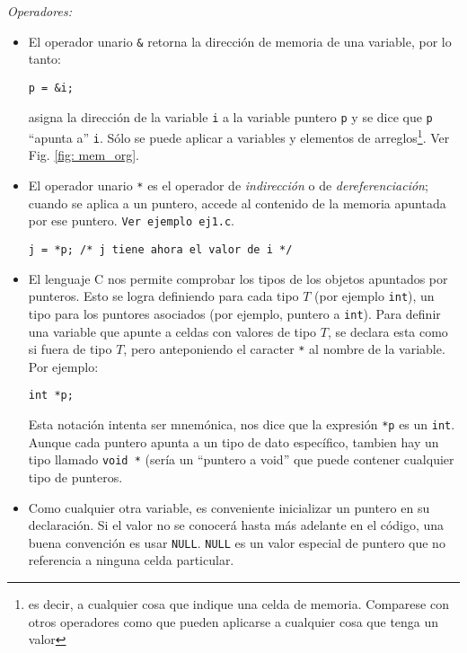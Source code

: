 \documentclass[12pt,a4paper,spanish]{article}
\begin{document}
\textit{Operadores:}
\begin{itemize}

\item El operador unario \texttt{\&} retorna la dirección de memoria de
una variable, por lo tanto:

\begin{verbatim}
p = &i;
\end{verbatim}

asigna la dirección de la variable \verb|i| a la variable puntero
\verb|p| y se dice que \verb|p| ``apunta a'' \verb|i|. Sólo se puede
aplicar a variables y elementos de arreglos\footnote{es decir, a cualquier cosa
que indique una celda de memoria. Comparese con otros operadores como que
pueden aplicarse a cualquier cosa que tenga un valor}. Ver Fig. \ref{fig:
mem_org}.

\item El operador unario \verb|*| es el operador de
\textit{indirección} o de \textit{dereferenciación}; cuando se
aplica a un puntero, accede al contenido de la memoria apuntada por
ese puntero. \verb+Ver ejemplo ej1.c+.

\begin{verbatim}
j = *p; /* j tiene ahora el valor de i */
\end{verbatim}

\item El lenguaje C nos permite comprobar los tipos de los objetos apuntados
por punteros. Esto se logra definiendo para cada tipo $T$ (por ejemplo
\verb|int|), un tipo para los puntores asociados (por ejemplo, puntero a 
\verb|int|). Para definir una variable que apunte a celdas con valores
de tipo $T$, se declara esta como si fuera de tipo $T$, pero anteponiendo
el caracter \verb|*| al nombre de la variable. Por ejemplo:

\begin{verbatim}
int *p;
\end{verbatim}

Esta notación intenta ser mnemónica, nos dice que la expresión
\verb|*p| es un \verb|int|. Aunque cada puntero apunta a un tipo
de dato específico, tambien hay un tipo llamado \verb|void *| (sería un
``puntero a void'' que puede contener cualquier tipo de punteros.

\item Como cualquier otra variable, es conveniente inicializar un
puntero en su declaración. Si el valor no se conocerá hasta más adelante
en el código, una buena convención es usar \verb+NULL+. \verb|NULL| es un valor
especial de puntero que no referencia a ninguna celda particular.


\end{itemize}
\end{document}
